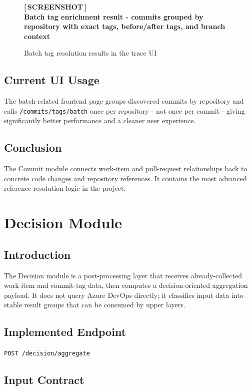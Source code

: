 \documentclass[12pt,a4paper]{report}
\newcommand{\screenshot}[2][Screenshot placeholder]{%
  \begin{figure}[H]
    \centering
    \begin{tcolorbox}[
      enhanced,
      colback=screenshotbg,
      colframe=screenshotborder,
      boxrule=1pt,
      arc=4pt,
      left=4pt, right=4pt, top=4pt, bottom=4pt,
      width=\textwidth,
      height=7cm,
      valign=center,
    ]
      \centering
      \color{primary}
      \large\bfseries [\,SCREENSHOT\,]\\[6pt]
      \normalsize\normalfont\color{darkgray}#1
    \end{tcolorbox}
    \caption{#2}
  \end{figure}%
}
\newcommand{\code}[1]{\texttt{\small\color{codered}#1}}
\begin{document}
\screenshot[Batch tag enrichment result - commits grouped by repository with exact tags, before/after tags, and branch context]{Batch tag resolution results in the trace UI}

\section{Current UI Usage}

The batch-related frontend page groups discovered commits by repository and calls
\code{/commits/tags/batch} once per repository - not once per commit - giving
significantly better performance and a cleaner user experience.

\section{Conclusion}

The Commit module connects work-item and pull-request relationships back to
concrete code changes and repository references. It contains the most advanced
reference-resolution logic in the project.

\chapter{Decision Module}

\section{Introduction}

The Decision module is a post-processing layer that receives already-collected
work-item and commit-tag data, then computes a decision-oriented aggregation
payload. It does not query Azure DevOps directly; it classifies input data into
stable result groups that can be consumed by upper layers.

\section{Implemented Endpoint}

\begin{center}
\code{POST /decision/aggregate}
\end{center}

\section{Input Contract}
\end{document}
